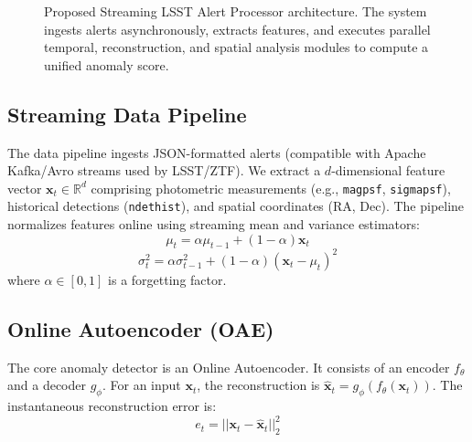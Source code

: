 \documentclass[10pt,journal,compsoc]{IEEEtran}
\begin{document}
\begin{figure}[htbp]
{
    }
    \caption{Proposed Streaming LSST Alert Processor architecture. The system ingests alerts asynchronously, extracts features, and executes parallel temporal, reconstruction, and spatial analysis modules to compute a unified anomaly score.}
    \label{fig:architecture}
\end{figure}

\subsection{Streaming Data Pipeline}
The data pipeline ingests JSON-formatted alerts (compatible with Apache Kafka/Avro streams used by LSST/ZTF). We extract a $d$-dimensional feature vector $\mathbf{x}_t \in \mathbb{R}^d$ comprising photometric measurements (e.g., \texttt{magpsf}, \texttt{sigmapsf}), historical detections (\texttt{ndethist}), and spatial coordinates (RA, Dec). The pipeline normalizes features online using streaming mean and variance estimators:
\begin{equation}
    \mu_t = \alpha \mu_{t-1} + (1 - \alpha) \mathbf{x}_t
\end{equation}
\begin{equation}
    \sigma^2_t = \alpha \sigma^2_{t-1} + (1 - \alpha) (\mathbf{x}_t - \mu_t)^2
\end{equation}
where $\alpha \in [0, 1]$ is a forgetting factor.

\subsection{Online Autoencoder (OAE)}
The core anomaly detector is an Online Autoencoder. It consists of an encoder $f_\theta$ and a decoder $g_\phi$. For an input $\mathbf{x}_t$, the reconstruction is $\mathbf{\hat{x}}_t = g_\phi(f_\theta(\mathbf{x}_t))$. The instantaneous reconstruction error is:
\begin{equation}
    e_t = ||\mathbf{x}_t - \mathbf{\hat{x}}_t||^2_2
\end{equation}
\end{document}
